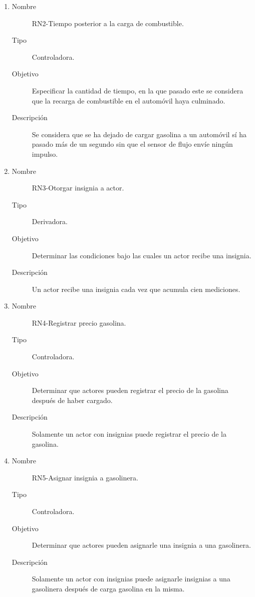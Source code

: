 \begin{enumerate}[label=RN\arabic*.]
	\item \label{RN2}
		\begin{description}
			\item[Nombre] RN2-Tiempo posterior a la carga de combustible.
			\item[Tipo] Controladora.
			\item[Objetivo] Especificar la cantidad de tiempo, en la que pasado este se considera que la recarga de combustible en el automóvil haya culminado.
			\item[Descripción] Se considera que se ha dejado de cargar gasolina a un automóvil sí ha pasado más de un segundo sin que el sensor de flujo envíe ningún impulso.
		\end{description}
	\item \label{RN3}
		\begin{description}
			\item[Nombre] RN3-Otorgar insignia a actor.
			\item[Tipo] Derivadora.
			\item[Objetivo] Determinar las condiciones bajo las cuales un actor recibe una insignia.
			\item[Descripción] Un actor recibe una insignia cada vez que acumula cien mediciones.
		\end{description}
	\item \label{RN4}
		\begin{description}
			\item[Nombre] RN4-Registrar precio gasolina.
			\item[Tipo] Controladora.
			\item[Objetivo] Determinar que actores pueden registrar el precio de la gasolina después de haber cargado.
			\item[Descripción] Solamente un actor con insignias puede registrar el precio de la gasolina.
		\end{description}
	\item \label{RN5}
		\begin{description}
			\item[Nombre] RN5-Asignar insignia a gasolinera.
			\item[Tipo] Controladora.
			\item[Objetivo] Determinar que actores pueden asignarle una insignia a una gasolinera.
			\item[Descripción] Solamente un actor con insignias puede asignarle insignias a una gasolinera después de carga gasolina en la misma.

\end{description}
\end{enumerate}
